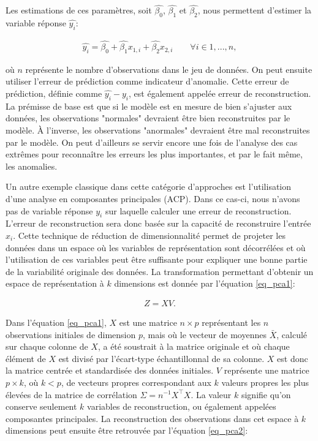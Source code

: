 Les estimations de ces paramètres, soit $\hat{\beta_0}$, $\hat{\beta_1}$ et $\hat{\beta_2}$, nous permettent d'estimer la variable réponse $\hat{y_i}$: 

\begin{gather}  \label{eq_reghat}
\hat{y_i} = \hat{\beta_0} + \hat{\beta_{1}} x_{1,i} + \hat{\beta_2} x_{2,i} \qquad \forall i \in {1,...,n},
\end{gather}

où $n$ représente le nombre d'observations dans le jeu de données. On peut ensuite utiliser l'erreur de prédiction comme indicateur d'anomalie. Cette erreur de prédiction, définie comme $\hat{y_i} - y_i$, est également appelée erreur de reconstruction. La prémisse de base est que si le modèle est en mesure de bien s'ajuster aux données, les observations "normales" devraient être bien reconstruites par le modèle. À l'inverse, les observations "anormales" devraient être mal reconstruites par le modèle.  On peut d'ailleurs se servir encore une fois de l'analyse des cas extrêmes pour reconnaître les erreurs les plus importantes, et par le fait même, les anomalies.
 
Un autre exemple classique dans cette catégorie d'approches est l'utilisation d'une analyse en composantes principales (ACP). Dans ce cas-ci, nous n'avons pas de variable réponse $y_i$ sur laquelle calculer une erreur de reconstruction. L'erreur de reconstruction sera donc basée sur la capacité de reconstruire l'entrée $x_i$. Cette technique de réduction de dimensionnalité permet de projeter les données dans un espace où les variables de représentation sont décorrélées et où l'utilisation de ces variables peut être suffisante pour expliquer une bonne partie de la variabilité originale des données. La transformation permettant d'obtenir un espace de représentation à $k$ dimensions est donnée par l'équation \ref{eq_pca1}:
 
 \begin{gather}  \label{eq_pca1}
 Z = XV.
 \end{gather}
 
Dans l'équation \ref{eq_pca1}, $X$ est une matrice $n \times p$ représentant les $n$  observations initiales de dimension $p$, mais où le vecteur de moyennes $\bar{X}$, calculé sur chaque colonne de $X$, a été soustrait à la matrice originale et où chaque élément de $X$ est divisé par l'écart-type échantillonnal de sa colonne. $X$ est donc la matrice centrée et standardisée des données initiales. $V$ représente une matrice $p \times k$, où $k < p$, de  vecteurs propres correspondant aux $k$ valeurs propres les plus élevées de la matrice de corrélation $\Sigma = n^{-1}X^\top X$. La valeur $k$ signifie qu'on conserve seulement $k$ variables de reconstruction, ou également appelées composantes principales. La reconstruction des observations dans cet espace à $k$ dimensions peut ensuite être retrouvée par l'équation \ref{eq_pca2}:
 
